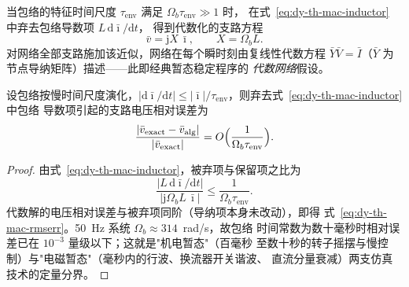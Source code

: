 \begin{definition}\label{def:dy-th-mac-rms}
当包络的特征时间尺度 $\tau_{\mathrm{env}}$ 满足 $\Omega_b\tau_{\mathrm{env}}\gg1$ 时，
在式~\eqref{eq:dy-th-mac-inductor} 中弃去包络导数项 $L\,\mathrm d\bar\imath/\mathrm dt$，
得到代数化的支路方程
\begin{equation}
\bar v=\mathrm jX\,\bar\imath,\qquad X=\Omega_b L .
\label{eq:dy-th-mac-algebraic}
\end{equation}
对网络全部支路施加该近似，网络在每个瞬时刻由复线性代数方程
$\bar Y\bar V=\bar I$（$\bar Y$ 为节点导纳矩阵）描述——此即经典暂态稳定程序的
\emph{代数网络}假设。
\end{definition}

\begin{proposition}[相量近似的相对误差量级]\label{prop:dy-th-mac-rmserr}
设包络按慢时间尺度演化，$|\mathrm d\bar\imath/\mathrm dt|\le
|\bar\imath|/\tau_{\mathrm{env}}$，则弃去式~\eqref{eq:dy-th-mac-inductor} 中包络
导数项引起的支路电压相对误差为
\begin{equation}
\frac{|\bar v_{\mathrm{exact}}-\bar v_{\mathrm{alg}}|}{|\bar v_{\mathrm{exact}}|}
=O\Bigl(\frac{1}{\Omega_b\tau_{\mathrm{env}}}\Bigr).
\label{eq:dy-th-mac-rmserr}
\end{equation}
\end{proposition}

\begin{proof}
由式~\eqref{eq:dy-th-mac-inductor}，被弃项与保留项之比为
\begin{equation}
\frac{|L\,\mathrm d\bar\imath/\mathrm dt|}{|\mathrm j\Omega_b L\,\bar\imath|}
\le\frac{1}{\Omega_b\tau_{\mathrm{env}}}.
\end{equation}
代数解的电压相对误差与被弃项同阶（导纳项本身未改动），即得
式~\eqref{eq:dy-th-mac-rmserr}。50~Hz 系统 $\Omega_b\approx314$~rad/s，故包络
时间常数为数十毫秒时相对误差已在 $10^{-3}$ 量级以下；这就是"机电暂态"（百毫秒
至数十秒的转子摇摆与慢控制）与"电磁暂态"（毫秒内的行波、换流器开关谐波、
直流分量衰减）两支仿真技术的定量分界。
\end{proof}

